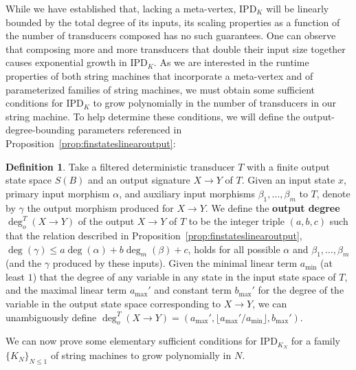 \documentclass{article}
\theoremstyle{definition}
\newtheorem{definition}{Definition}[section]
\theoremstyle{remark}
\begin{document}
While we have established that, lacking a meta-vertex,
$\mathrm{IPD}_K$ will be linearly bounded
by the total degree of its
inputs, its scaling properties as a function of
the number of transducers composed has no such guarantees. One can
observe that composing more and more transducers that double
their input size together causes exponential growth
in $\mathrm{IPD}_K$. As we are
interested in the runtime properties of both string machines that
incorporate a meta-vertex and of parameterized families of string
machines, we must obtain some sufficient conditions for
$\mathrm{IPD}_K$ to
grow polynomially in the number of transducers in
our string machine. To help determine these conditions,
we will define the output-degree-bounding parameters referenced in
Proposition~\ref{prop:finstateslinearoutput}:
\begin{definition}
    \label{def:outputdegree} Take a filtered deterministic transducer
    $T$
    with a finite output state space $S(B)$ and an output signature
    $X \to Y$ of $T$. Given an input state $x$, primary input
    morphism
    $\alpha$, and auxiliary input morphisms $\beta_1,\dots,\beta_m$
    to $T$,
    denote by $\gamma$ the output morphism produced for $X\to Y$.
    We define the \textbf{output degree}
    $\deg_o^T(X\to Y)$ of the output $X\to Y$
    of $T$ to be the integer triple $(a,b,c)$ such that the relation
    described in Proposition~\ref{prop:finstateslinearoutput},
    $\deg(\gamma) \leq a \deg(\alpha)+b \deg_m(\beta)+c$, holds for
    all possible $\alpha$ and $\beta_1,\dots,\beta_m$ (and the
    $\gamma$ produced by these inputs). Given the minimal linear
    term $a_{\min}$ (at least $1$) that the degree of any variable
    in any state in the input state space of $T$, and the maximal
    linear term $a_{\max}'$ and
    constant term $b_{\max}'$ for the degree of the variable in the output
    state space corresponding to $X\to Y$, we can unambiguously
    define $\deg_o^T(X\to Y) = (a_{\max}',\lfloor a_{\max}'/a_{\min}\rfloor,
    b_{\max}')$.
\end{definition}
We can now prove some elementary sufficient conditions for
$\mathrm{IPD}_{K_N}$ for a family $\{K_N\}_{N\leq 1}$ of string
machines to grow polynomially in $N$.
\end{document}
